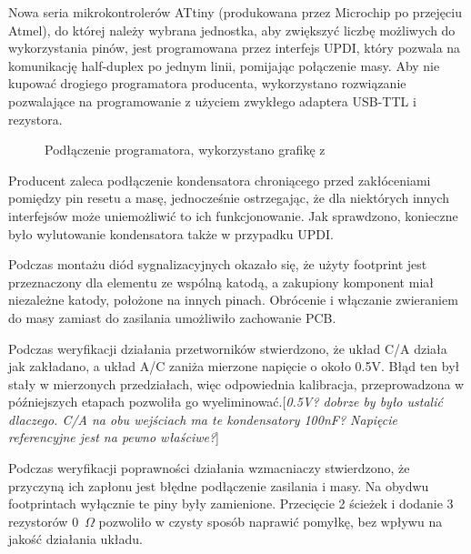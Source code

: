 \documentclass[polish,engineer]{polsl-msth}
\newcommand{\remark}[1]{{[\color{GREEN}\emph{\footnotesize #1}{}]}}
\begin{document}
Nowa seria mikrokontrolerów ATtiny (produkowana przez Microchip po przejęciu Atmel), do której należy wybrana jednostka, aby zwiększyć liczbę możliwych do wykorzystania pinów, jest programowana przez interfejs UPDI, który pozwala na komunikację half-duplex po jednym linii, pomijając połączenie masy. Aby nie kupować drogiego programatora producenta, wykorzystano rozwiązanie pozwalające na programowanie z użyciem zwykłego adaptera USB-TTL i rezystora\cite{pyupdi}.
\begin{figure}[hbtp]
\centering
     \caption{Podłączenie programatora, wykorzystano grafikę z \cite{pyupdi}\label{img:pyupdi}}
\end{figure}
Producent zaleca podłączenie kondensatora chroniącego przed zakłóceniami pomiędzy pin resetu a masę, jednocześnie ostrzegając, że dla niektórych innych interfejsów może uniemożliwić to ich funkcjonowanie\cite{avr_hardware}. Jak sprawdzono, konieczne było wylutowanie kondensatora także w przypadku UPDI.

Podczas montażu diód sygnalizacyjnych okazało się, że użyty footprint jest przeznaczony dla elementu ze wspólną katodą, a zakupiony komponent miał niezależne katody, położone na innych pinach. Obrócenie i włączanie zwieraniem do masy zamiast do zasilania umożliwiło zachowanie PCB.

Podczas weryfikacji działania przetworników stwierdzono, że układ C/A działa jak zakładano, a układ A/C zaniża mierzone napięcie o około 0.5V. Błąd ten był stały w mierzonych przedziałach, więc odpowiednia kalibracja, przeprowadzona w późniejszych etapach pozwoliła go wyeliminować.\remark{0.5V? dobrze by było ustalić dlaczego. C/A na obu wejściach ma te kondensatory 100nF? Napięcie referencyjne jest na pewno właściwe?}

Podczas weryfikacji poprawności działania wzmacniaczy stwierdzono, że przyczyną ich zapłonu jest błędne podłączenie zasilania i masy. Na obydwu footprintach wyłącznie te piny były zamienione. Przecięcie 2 ścieżek i dodanie 3 rezystorów 0~$\Omega$ pozwoliło w czysty sposób naprawić pomyłkę, bez wpływu na jakość działania układu.
\end{document}
